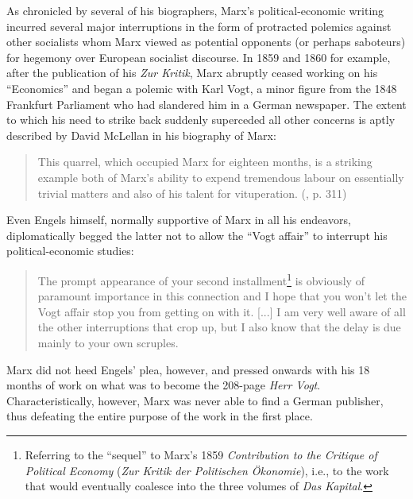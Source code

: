 As chronicled by several of his biographers, Marx's political-economic writing incurred several major interruptions in the form of protracted polemics against other socialists whom Marx viewed as potential opponents (or perhaps saboteurs) for hegemony over European socialist discourse. In 1859 and 1860 for example, after the publication of his \textit{Zur Kritik}, Marx abruptly ceased working on his ``Economics'' and began a polemic with Karl Vogt, a minor figure from the 1848 Frankfurt Parliament who had slandered him in a German newspaper. The extent to which his need to strike back suddenly superceded all other concerns is aptly described by David McLellan in his biography of Marx:
\begin{quote}
This quarrel, which occupied Marx for eighteen months, is a striking example both of Marx's ability to expend tremendous labour on essentially trivial matters and also of his talent for vituperation. (\cite{mclellan_karl_1973}, p. 311)
\end{quote}
Even Engels himself, normally supportive of Marx in all his endeavors, diplomatically begged the latter not to allow the ``Vogt affair'' to interrupt his political-economic studies:
\begin{quote}
The prompt appearance of your second installment\footnote{Referring to the ``sequel'' to Marx's 1859 \textit{Contribution to the Critique of Political Economy} (\textit{Zur Kritik der Politischen Ökonomie}), i.e., to the work that would eventually coalesce into the three volumes of \textit{Das Kapital}.} is obviously of paramount importance in this connection and I hope that you won't let the Vogt affair stop you from getting on with it. [...] I am very well aware of all the other interruptions that crop up, but I also know that the
delay is due mainly to your own scruples.
\end{quote}
Marx did not heed Engels' plea, however, and pressed onwards with his 18 months of work on what was to become the 208-page \textit{Herr Vogt}. Characteristically, however, Marx was never able to find a German publisher, thus defeating the entire purpose of the work in the first place.


